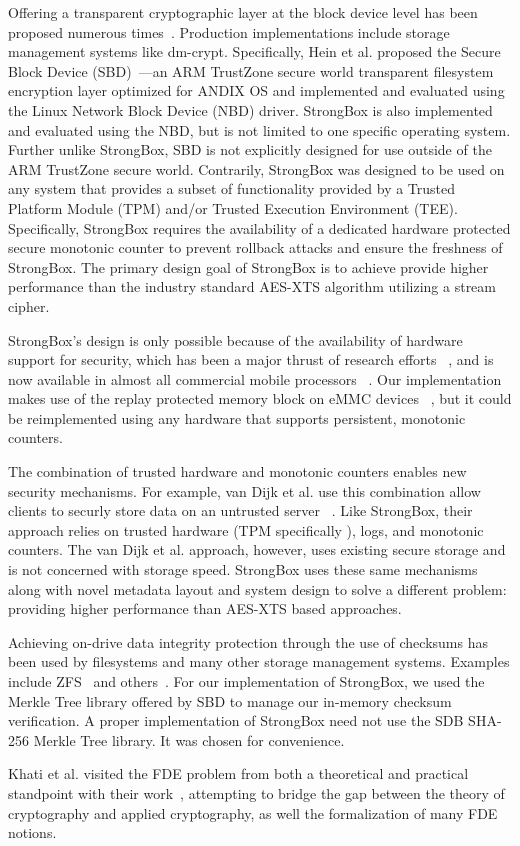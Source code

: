 Offering a transparent cryptographic layer at the block device level has been
proposed numerous times~\cite{SBD}. Production implementations include storage
management systems like dm-crypt. Specifically, Hein et al. proposed the Secure
Block Device (SBD)~\cite{SBD}---an ARM TrustZone secure world transparent
filesystem encryption layer optimized for ANDIX OS and implemented and evaluated
using the Linux Network Block Device (NBD) driver. StrongBox is also implemented
and evaluated using the NBD, but is not limited to one specific operating
system. Further unlike StrongBox, SBD is not explicitly designed for use outside
of the ARM TrustZone secure world. Contrarily, StrongBox was designed to be used
on any system that provides a subset of functionality provided by a Trusted
Platform Module (TPM) and/or Trusted Execution Environment (TEE). Specifically,
StrongBox requires the availability of a dedicated hardware protected secure
monotonic counter to prevent rollback attacks and ensure the freshness of
StrongBox. The primary design goal of StrongBox is to achieve provide higher
performance than the industry standard AES-XTS algorithm utilizing a stream
cipher.

StrongBox's design is only possible because of the availability of
hardware support for security, which has been a major thrust of
research efforts
~\cite{asplos1,asplos2,asplos3,asplos4,isca1,isca2},
and is now available in almost all commercial mobile processors
~\cite{TPM,TEE,RPMB,Kirovski}. Our implementation makes use of the
replay protected memory block on eMMC devices
~\cite{eMMC-standard,RPMB}, but it could be reimplemented using any
hardware that supports persistent, monotonic counters.

The combination of trusted hardware and monotonic counters enables new
security mechanisms. For example, van Dijk et al. use this
combination allow clients to securly store data on an untrusted server
~\cite{CSAIL-TPM}. Like StrongBox, their approach relies on trusted
hardware (TPM specifically \cite{TPM}), logs, and monotonic counters.
The van Dijk et al. approach, however, uses existing secure storage
and is not concerned with storage speed. StrongBox uses these same
mechanisms along with novel metadata layout and system design to solve
a different problem: providing higher performance than AES-XTS based
approaches.

Achieving on-drive data integrity protection through the use of checksums has
been used by filesystems and many other storage management systems. Examples
include ZFS~\cite{ZFS} and others~\cite{SBD}. For our implementation of
StrongBox, we used the Merkle Tree library offered by SBD to manage our
in-memory checksum verification. A proper implementation of StrongBox need not
use the SDB SHA-256 Merkle Tree library. It was chosen for convenience.

Khati et al. visited the FDE problem from both a theoretical and practical
standpoint with their work~\cite{FDETheoryPrac}, attempting to bridge the gap
between the theory of cryptography and applied cryptography, as well the
formalization of many FDE notions.

